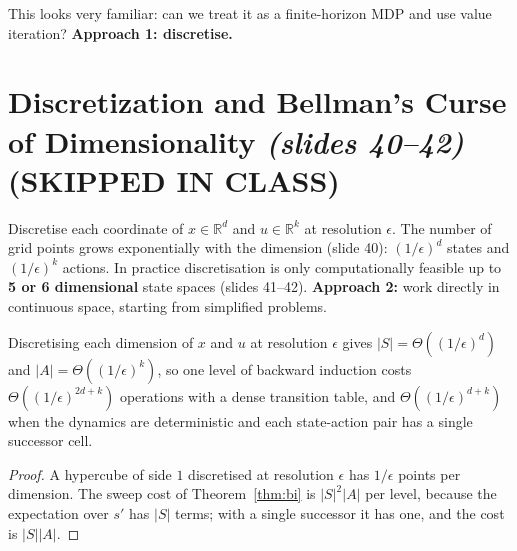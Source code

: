 \documentclass[11pt,a4paper]{article}
\newcommand{\R}{\mathbb{R}}
\newcommand{\slides}[1]{\emph{(slides #1)}}
\theoremstyle{plain}
\theoremstyle{definition}
\theoremstyle{remark}
\begin{document}
This looks very familiar: can we treat it as a finite-horizon MDP and use value iteration? \textbf{Approach 1: discretise.}

\section{Discretization and Bellman's Curse of Dimensionality \slides{40--42} (SKIPPED IN CLASS)}

Discretise each coordinate of $x\in\R^d$ and $u\in\R^k$ at resolution $\epsilon$. The number of grid points grows exponentially with the dimension (slide 40): $(1/\epsilon)^d$ states and $(1/\epsilon)^k$ actions. In practice discretisation is only computationally feasible up to \textbf{5 or 6 dimensional} state spaces (slides 41--42). \textbf{Approach 2:} work directly in continuous space, starting from simplified problems.

\begin{proposition}\label{prop:curse}
Discretising each dimension of $x$ and $u$ at resolution $\epsilon$ gives $|S|=\Theta((1/\epsilon)^d)$ and $|A|=\Theta((1/\epsilon)^k)$, so one level of backward induction costs $\Theta((1/\epsilon)^{2d+k})$ operations with a dense transition table, and $\Theta((1/\epsilon)^{d+k})$ when the dynamics are deterministic and each state-action pair has a single successor cell.
\end{proposition}
\begin{proof}
A hypercube of side $1$ discretised at resolution $\epsilon$ has $1/\epsilon$ points per dimension. The sweep cost of Theorem~\ref{thm:bi} is $|S|^2|A|$ per level, because the expectation over $s'$ has $|S|$ terms; with a single successor it has one, and the cost is $|S||A|$.
\end{proof}
\end{document}

